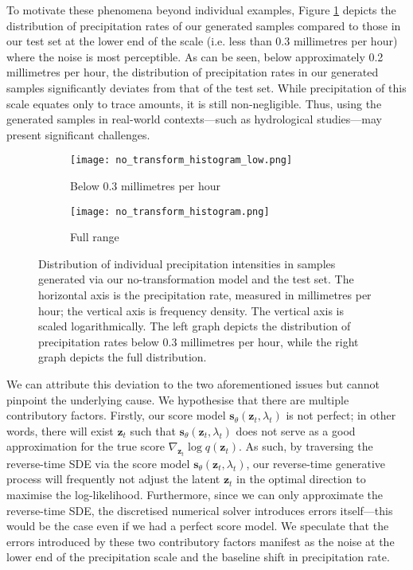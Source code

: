 \documentclass[ oneside,%
                    author={George Herbert},
                    degree={MSci},
                     title={Diffusion Models for Time-Evolving Precipitation Fields},
                  subtitle={}]{dissertation}
\begin{document}
To motivate these phenomena beyond individual examples, Figure \ref{fig:no_transform_histogram_low} depicts the distribution of precipitation rates of our generated samples compared to those in our test set at the lower end of the scale (i.e. less than 0.3 millimetres per hour) where the noise is most perceptible. As can be seen, below approximately 0.2 millimetres per hour, the distribution of precipitation rates in our generated samples significantly deviates from that of the test set. While precipitation of this scale equates only to trace amounts, it is still non-negligible. Thus, using the generated samples in real-world contexts---such as hydrological studies---may present significant challenges.

\begin{figure}[htbp]
      \centering
      \begin{subfigure}{0.49\textwidth}
            \texttt{[image: no\_transform\_histogram\_low.png]}
            \caption{Below 0.3 millimetres per hour}
            \label{fig:no_transform_histogram_low}
      \end{subfigure}
      \begin{subfigure}{0.49\textwidth}
            \texttt{[image: no\_transform\_histogram.png]}
            \caption{Full range}
            \label{fig:no_transform_histogram_high}
      \end{subfigure}
      \caption{Distribution of individual precipitation intensities in samples generated via our no-transformation model and the test set. The horizontal axis is the precipitation rate, measured in millimetres per hour; the vertical axis is frequency density. The vertical axis is scaled logarithmically. The left graph depicts the distribution of precipitation rates below 0.3 millimetres per hour, while the right graph depicts the full distribution.}
      \label{fig:no_transform_histogram}
\end{figure}

We can attribute this deviation to the two aforementioned issues but cannot pinpoint the underlying cause. We hypothesise that there are multiple contributory factors. Firstly, our score model $\mathbf{s}_\theta(\mathbf{z}_t, \lambda_t)$ is not perfect; in other words, there will exist $\mathbf{z}_t$ such that $\mathbf{s}_\theta(\mathbf{z}_t, \lambda_t)$ does not serve as a good approximation for the true score $\nabla_{\mathbf{z}_t}  \log q(\mathbf{z}_t)$. As such, by traversing the reverse-time SDE via the score model $\mathbf{s}_\theta(\mathbf{z}_t,\lambda_t)$, our reverse-time generative process will frequently not adjust the latent $\mathbf{z}_t$ in the optimal direction to maximise the log-likelihood. Furthermore, since we can only approximate the reverse-time SDE, the discretised numerical solver introduces errors itself---this would be the case even if we had a perfect score model. We speculate that the errors introduced by these two contributory factors manifest as the noise at the lower end of the precipitation scale and the baseline shift in precipitation rate.
\end{document}
